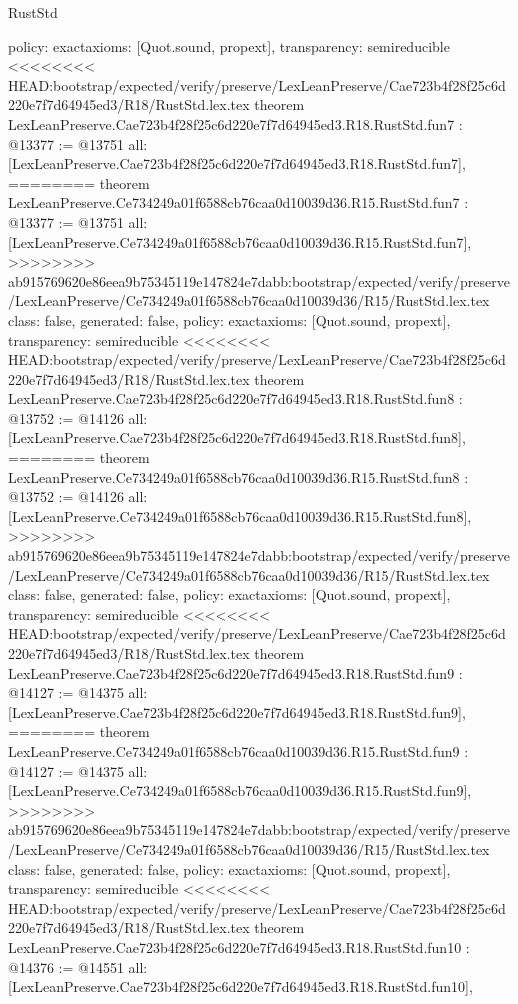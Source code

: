 \begin{lexlean}{RustStd}
\begin{coremodule}
{\begin{coremodule}
{{{{{{{{{{  policy: exact{axioms: [Quot.sound, propext]},
  transparency: semireducible
}
<<<<<<<< HEAD:bootstrap/expected/verify/preserve/LexLeanPreserve/Cae723b4f28f25c6d220e7f7d64945ed3/R18/RustStd.lex.tex
theorem LexLeanPreserve.Cae723b4f28f25c6d220e7f7d64945ed3.R18.RustStd.fun7 : @13377 := @13751 {
  all: [LexLeanPreserve.Cae723b4f28f25c6d220e7f7d64945ed3.R18.RustStd.fun7],
========
theorem LexLeanPreserve.Ce734249a01f6588cb76caa0d10039d36.R15.RustStd.fun7 : @13377 := @13751 {
  all: [LexLeanPreserve.Ce734249a01f6588cb76caa0d10039d36.R15.RustStd.fun7],
>>>>>>>> ab915769620e86eea9b75345119e147824e7dabb:bootstrap/expected/verify/preserve/LexLeanPreserve/Ce734249a01f6588cb76caa0d10039d36/R15/RustStd.lex.tex
  class: false,
  generated: false,
  policy: exact{axioms: [Quot.sound, propext]},
  transparency: semireducible
}
<<<<<<<< HEAD:bootstrap/expected/verify/preserve/LexLeanPreserve/Cae723b4f28f25c6d220e7f7d64945ed3/R18/RustStd.lex.tex
theorem LexLeanPreserve.Cae723b4f28f25c6d220e7f7d64945ed3.R18.RustStd.fun8 : @13752 := @14126 {
  all: [LexLeanPreserve.Cae723b4f28f25c6d220e7f7d64945ed3.R18.RustStd.fun8],
========
theorem LexLeanPreserve.Ce734249a01f6588cb76caa0d10039d36.R15.RustStd.fun8 : @13752 := @14126 {
  all: [LexLeanPreserve.Ce734249a01f6588cb76caa0d10039d36.R15.RustStd.fun8],
>>>>>>>> ab915769620e86eea9b75345119e147824e7dabb:bootstrap/expected/verify/preserve/LexLeanPreserve/Ce734249a01f6588cb76caa0d10039d36/R15/RustStd.lex.tex
  class: false,
  generated: false,
  policy: exact{axioms: [Quot.sound, propext]},
  transparency: semireducible
}
<<<<<<<< HEAD:bootstrap/expected/verify/preserve/LexLeanPreserve/Cae723b4f28f25c6d220e7f7d64945ed3/R18/RustStd.lex.tex
theorem LexLeanPreserve.Cae723b4f28f25c6d220e7f7d64945ed3.R18.RustStd.fun9 : @14127 := @14375 {
  all: [LexLeanPreserve.Cae723b4f28f25c6d220e7f7d64945ed3.R18.RustStd.fun9],
========
theorem LexLeanPreserve.Ce734249a01f6588cb76caa0d10039d36.R15.RustStd.fun9 : @14127 := @14375 {
  all: [LexLeanPreserve.Ce734249a01f6588cb76caa0d10039d36.R15.RustStd.fun9],
>>>>>>>> ab915769620e86eea9b75345119e147824e7dabb:bootstrap/expected/verify/preserve/LexLeanPreserve/Ce734249a01f6588cb76caa0d10039d36/R15/RustStd.lex.tex
  class: false,
  generated: false,
  policy: exact{axioms: [Quot.sound, propext]},
  transparency: semireducible
}
<<<<<<<< HEAD:bootstrap/expected/verify/preserve/LexLeanPreserve/Cae723b4f28f25c6d220e7f7d64945ed3/R18/RustStd.lex.tex
theorem LexLeanPreserve.Cae723b4f28f25c6d220e7f7d64945ed3.R18.RustStd.fun10 : @14376 := @14551 {
  all: [LexLeanPreserve.Cae723b4f28f25c6d220e7f7d64945ed3.R18.RustStd.fun10],
}}}}}}}}}}}}}
\end{coremodule}}
\end{coremodule}
\end{lexlean}
